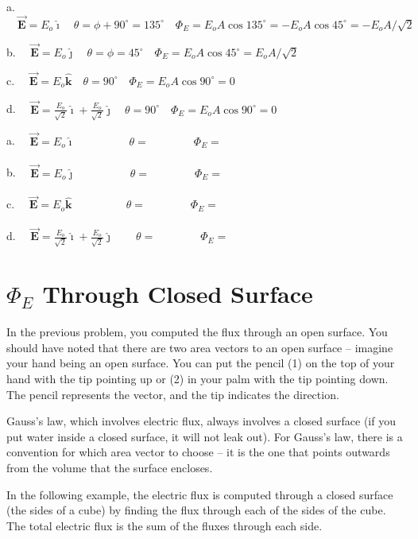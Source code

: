 \documentclass{article}
\newcommand{\ds}[0]{\displaystyle}
\newcommand{\ihat}[0]{\hat{\boldsymbol{\imath}}}
\newcommand{\jhat}[0]{\hat{\boldsymbol{\jmath}}}
\newcommand{\khat}[0]{\hat{\boldsymbol{k}}}
\newcommand{\bfvec}[1]{\vec{\mathbf{#1}}}
\begin{document}


a. $\quad\ds\bfvec{E}=E_o\ihat\quad\theta=\phi+90^\circ=135^\circ\quad\Phi_E=E_oA\cos 135^\circ=-E_oA\cos 45^\circ=-E_oA/\sqrt{2}$

b. $\quad\ds\bfvec{E}=E_o\jhat\quad\theta=\phi=45^\circ\quad\Phi_E=E_oA\cos 45^\circ=E_oA/\sqrt{2}$ 

c. $\quad\ds\bfvec{E}=E_o\khat\quad\theta=90^\circ\quad\Phi_E=E_oA\cos 90^\circ=0$ 

d. $\quad\ds\bfvec{E}=\frac{E_o}{\sqrt{2}}\ihat + \frac{E_o}{\sqrt{2}}\jhat\quad\theta=90^\circ\quad\Phi_E=E_oA\cos 90^\circ=0$
\else



a. $\quad\ds\bfvec{E}=E_o\ihat\qquad\phantom{+\frac{E_o}{\sqrt{2}}\jhat}\theta=\qquad\qquad\Phi_E=$

b. $\quad\ds\bfvec{E}=E_o\jhat\qquad\phantom{+ \frac{E_o}{\sqrt{2}}\jhat}\theta=\qquad\qquad\Phi_E=$ 

c. $\quad\ds\bfvec{E}=E_o\khat\qquad\phantom{+\frac{E_o}{\sqrt{2}}\jhat}\theta=\qquad\qquad\Phi_E=$ 

d. $\quad\ds\bfvec{E}=\frac{E_o}{\sqrt{2}}\ihat + \frac{E_o}{\sqrt{2}}\jhat\qquad\theta=\qquad\qquad\Phi_E=$
\fi

\section{$\Phi_E$ Through Closed Surface}

In the previous problem, you computed the flux through an open surface. You should have noted that there are two area vectors to an open surface -- imagine your hand being an open surface. You can put the pencil (1) on the top of your hand with the tip pointing up or (2) in your palm with the tip pointing down. The pencil represents the vector, and the tip indicates the direction.

Gauss's law, which involves electric flux, always involves a closed surface (if you put water inside a closed surface, it will not leak out). For Gauss's law, there is a convention for which area vector to choose -- it is the one that points outwards from the volume that the surface encloses. 

In the following example, the electric flux is computed through a closed surface (the sides of a cube) by finding the flux through each of the sides of the cube. The total electric flux is the sum of the fluxes through each side.
\end{document}
